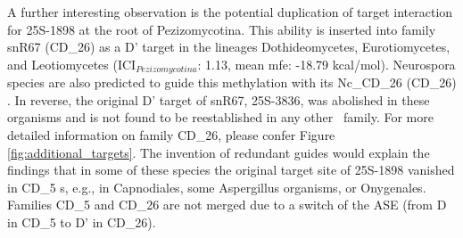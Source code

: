 A further interesting observation is the potential duplication of
target interaction for 25S-1898 at the root of Pezizomycotina. This
ability is inserted into family snR67 (CD\_26) as a D' target in the
lineages Dothideomycetes, Eurotiomycetes, and Leotiomycetes
(ICI$_{Pezizomycotina}$: 1.13, mean mfe: -18.79 kcal/mol). Neurospora
species are also predicted to guide this methylation with its
Nc\_CD\_26 (CD\_26) \sno \cite{Liu:2009}. In reverse, the original D'
target of snR67, 25S-3836, was abolished in these organisms and is not
found to be reestablished in any other \sno\ family. For more detailed
information on family CD\_26, please confer Figure
\ref{fig:additional_targets}. The invention of redundant guides would
explain the findings that in some of these species the original target
site of 25S-1898 vanished in CD\_5 \sno s, e.g., in Capnodiales, some
Aspergillus organisms, or Onygenales. Families CD\_5 and CD\_26 are
not merged due to a switch of the ASE (from D in CD\_5 to D' in
CD\_26).


